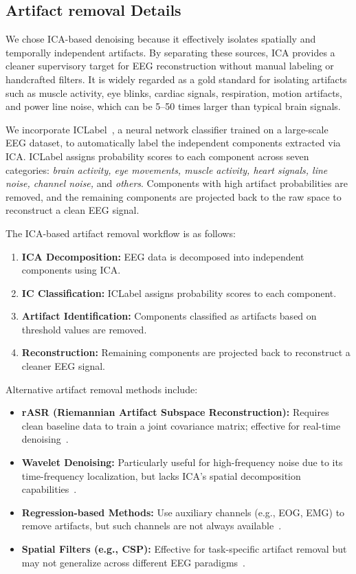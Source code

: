 \documentclass{article} %
\begin{document}
\subsection{Artifact removal Details} \label{app:artifact}

We chose ICA-based denoising because it effectively isolates spatially and temporally independent artifacts. By separating these sources, ICA provides a cleaner supervisory target for EEG reconstruction without manual labeling or handcrafted filters. It is widely regarded as a gold standard for isolating artifacts such as muscle activity, eye blinks, cardiac signals, respiration, motion artifacts, and power line noise, which can be 5–50 times larger than typical brain signals.

We incorporate ICLabel~\cite{IClabel}, a neural network classifier trained on a large-scale EEG dataset, to automatically label the independent components extracted via ICA. ICLabel assigns probability scores to each component across seven categories: \textit{brain activity, eye movements, muscle activity, heart signals, line noise, channel noise,} and \textit{others}. Components with high artifact probabilities are removed, and the remaining components are projected back to the raw space to reconstruct a clean EEG signal.

The ICA-based artifact removal workflow is as follows:
\begin{enumerate}[left=0em]
    \item \textbf{ICA Decomposition:} EEG data is decomposed into independent components using ICA.
    \item \textbf{IC Classification:} ICLabel assigns probability scores to each component.
    \item \textbf{Artifact Identification:} Components classified as artifacts based on threshold values are removed.
    \item \textbf{Reconstruction:} Remaining components are projected back to reconstruct a cleaner EEG signal.
\end{enumerate}

Alternative artifact removal methods include:
\begin{itemize}[left=0em]
    \item \textbf{rASR (Riemannian Artifact Subspace Reconstruction):} Requires clean baseline data to train a joint covariance matrix; effective for real-time denoising~\citep{rASR}.
    \item \textbf{Wavelet Denoising:} Particularly useful for high-frequency noise due to its time-frequency localization, but lacks ICA’s spatial decomposition capabilities~\citep{wavelet_denoising}.
    \item \textbf{Regression-based Methods:} Use auxiliary channels (e.g., EOG, EMG) to remove artifacts, but such channels are not always available~\citep{artifacts_survey}.
    \item \textbf{Spatial Filters (e.g., CSP):} Effective for task-specific artifact removal but may not generalize across different EEG paradigms~\citep{CSP}.
\end{itemize}
\end{document}
